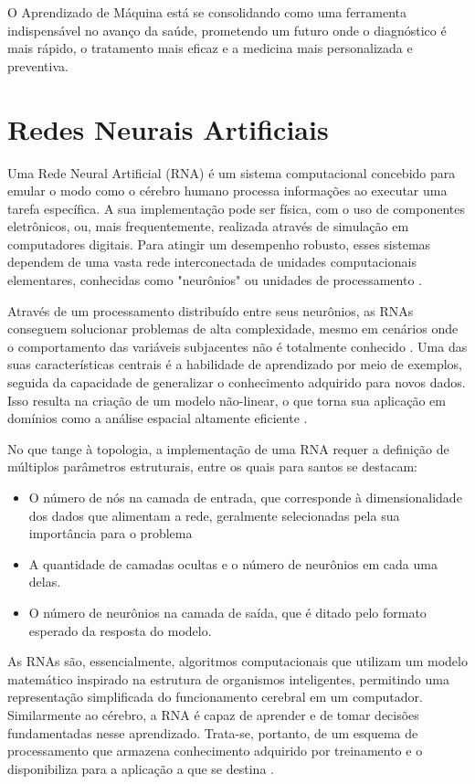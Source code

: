 O Aprendizado de Máquina está se consolidando como uma ferramenta indispensável no avanço da saúde, prometendo um futuro onde o diagnóstico é mais rápido, o tratamento mais eficaz e a medicina mais personalizada e preventiva.


\section{Redes Neurais Artificiais}
Uma Rede Neural Artificial (RNA) é um sistema computacional concebido para emular o modo como o cérebro humano processa informações ao executar uma tarefa específica. A sua implementação pode ser física, com o uso de componentes eletrônicos, ou, mais frequentemente, realizada através de simulação em computadores digitais. Para atingir um desempenho robusto, esses sistemas dependem de uma vasta rede interconectada de unidades computacionais elementares, conhecidas como "neurônios" ou unidades de processamento \cite{Haykin2009}.

Através de um processamento distribuído entre seus neurônios, as RNAs conseguem solucionar problemas de alta complexidade, mesmo em cenários onde o comportamento das variáveis subjacentes não é totalmente conhecido \cite{Busnardo2024}. Uma das suas características centrais é a habilidade de aprendizado por meio de exemplos, seguida da capacidade de generalizar o conhecimento adquirido para novos dados. Isso resulta na criação de um modelo não-linear, o que torna sua aplicação em domínios como a análise espacial altamente eficiente \cite{Sporl2011}.

No que tange à topologia, a implementação de uma RNA requer a definição de múltiplos parâmetros estruturais, entre os quais para santos\cite {Santos2005} se destacam: 
\begin{itemize}
	\item O número de nós na camada de entrada, que corresponde à dimensionalidade dos dados que alimentam a rede, geralmente selecionadas pela sua importância para o problema
	\item A quantidade de camadas ocultas e o número de neurônios em cada uma delas. 
	\item O número de neurônios na camada de saída, que é ditado pelo formato esperado da resposta do modelo.
\end{itemize}
As RNAs são, essencialmente, algoritmos computacionais que utilizam um modelo matemático inspirado na estrutura de organismos inteligentes, permitindo uma representação simplificada do funcionamento cerebral em um computador. Similarmente ao cérebro, a RNA é capaz de aprender e de tomar decisões fundamentadas nesse aprendizado. Trata-se, portanto, de um esquema de processamento que armazena conhecimento adquirido por treinamento e o disponibiliza para a aplicação a que se destina \cite{Sporl2011}.

